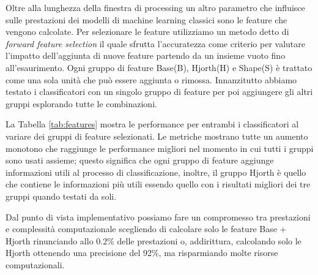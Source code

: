 Oltre alla lunghezza della finestra di processing un altro parametro che influisce sulle prestazioni dei modelli di machine learning classici sono le feature che vengono calcolate. Per selezionare le feature utilizziamo un metodo detto di \textit{forward feature selection} il quale sfrutta l'accuratezza come criterio per valutare l'impatto dell'aggiunta di nuove feature partendo da un insieme vuoto fino all'esaurimento. Ogni gruppo di feature Base(B), Hjorth(H) e Shape(S) è trattato come una sola unità che può essere aggiunta o rimossa. Innanzitutto abbiamo testato i classificatori con un singolo gruppo di feature per poi aggiungere gli altri gruppi esplorando tutte le combinazioni.

La Tabella \ref{tab:features} mostra le performance per entrambi i classificatori al variare dei gruppi di feature selezionati. Le metriche mostrano tutte un aumento monotono che raggiunge le performance migliori nel momento in cui tutti i gruppi sono usati assieme; questo significa che ogni gruppo di feature aggiunge informazioni utili al processo di classificazione, inoltre, il gruppo Hjorth è quello che contiene le informazioni più utili essendo quello con  i risultati migliori dei tre gruppi quando testati da soli. 

Dal punto di vista implementativo possiamo fare un compromesso tra prestazioni e complessità computazionale scegliendo di calcolare solo le feature Base + Hjorth rinunciando allo 0.2\% delle prestazioni o, addirittura, calcolando solo le Hjorth ottenendo una precisione del 92\%, ma risparmiando molte risorse computazionali.

